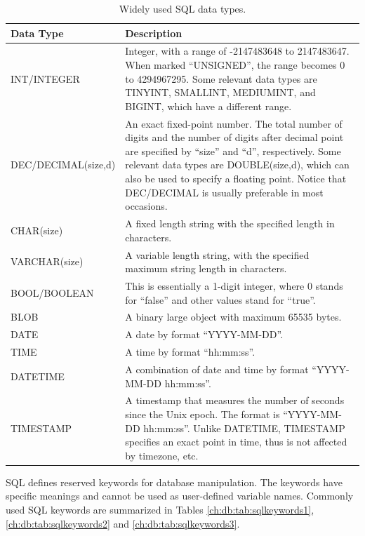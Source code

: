 \begin{table}
	\centering \caption{Widely used SQL data types.}\label{ch:db:tab:sqldatatypes}
	\begin{tabularx}{\textwidth}{lX}
		\hline
		Data Type & Description \\ \hline
		INT/INTEGER & Integer, with a range of -2147483648 to 2147483647. When marked ``UNSIGNED'', the range becomes 0 to 4294967295. Some relevant data types are TINYINT, SMALLINT, MEDIUMINT, and BIGINT, which have a different range. \\ \hdashline
		DEC/DECIMAL(size,d) & An exact fixed-point number. The total number of digits and the number of digits after decimal point are specified by ``size'' and ``d'', respectively. Some relevant data types are DOUBLE(size,d), which can also be used to specify a floating point. Notice that DEC/DECIMAL is usually preferable in most occasions. \\ \hdashline
		CHAR(size) & A fixed length string with the specified length in characters. \\ \hdashline
		VARCHAR(size) & A variable length string, with the specified maximum string length in characters. \\ \hdashline
		BOOL/BOOLEAN & This is essentially a 1-digit integer, where 0 stands for ``false'' and other values stand for ``true''. \\ \hdashline
		BLOB & A binary large object with maximum 65535 bytes. \\ \hdashline
		DATE & A date by format ``YYYY-MM-DD''. \\ \hdashline
		TIME & A time by format ``hh:mm:ss''. \\ \hdashline
		DATETIME & A combination of date and time by format ``YYYY-MM-DD hh:mm:ss''. \\ \hdashline
		TIMESTAMP & A timestamp that measures the number of seconds since the Unix epoch. The format is ``YYYY-MM-DD hh:mm:ss''. Unlike DATETIME, TIMESTAMP specifies an exact point in time, thus is not affected by timezone, etc. \\ \hline
	\end{tabularx}
\end{table}

SQL defines reserved keywords for database manipulation. The keywords have specific meanings and cannot be used as user-defined variable names. Commonly used SQL keywords are summarized in Tables \ref{ch:db:tab:sqlkeywords1}, \ref{ch:db:tab:sqlkeywords2} and \ref{ch:db:tab:sqlkeywords3}.

